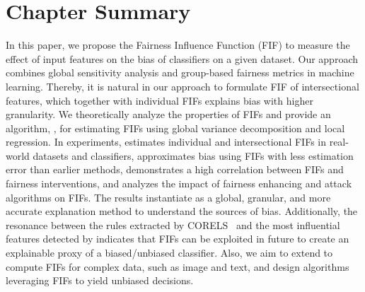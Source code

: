 \section{Chapter Summary}


In this paper, we propose the Fairness Influence Function (FIF) to measure the effect of input features on the bias of classifiers on a given dataset. Our approach combines global sensitivity analysis and group-based fairness metrics in machine learning. Thereby, it is natural in our approach to formulate FIF of intersectional features, which together with individual FIFs explains bias with higher granularity. We theoretically analyze the properties of FIFs and provide an algorithm, {\fairXplainer}, for estimating FIFs using global variance decomposition and local regression. In experiments, {\fairXplainer} estimates individual and intersectional FIFs in real-world datasets and classifiers, approximates bias using FIFs with less estimation error than earlier methods, demonstrates a high correlation between FIFs and fairness interventions, and analyzes the impact of fairness enhancing and attack algorithms on FIFs. The results instantiate {\fairXplainer} as a global, granular, and more accurate explanation method to understand the sources of bias. Additionally, the resonance between the rules extracted by CORELS~\cite{rudin19stop} and the most influential features detected by {\fairXplainer} indicates that FIFs can be exploited in future to create an explainable proxy of a biased/unbiased classifier. Also, we aim to extend {\fairXplainer} to compute FIFs for complex data, such as image and text, and design algorithms leveraging FIFs to yield unbiased decisions.
%